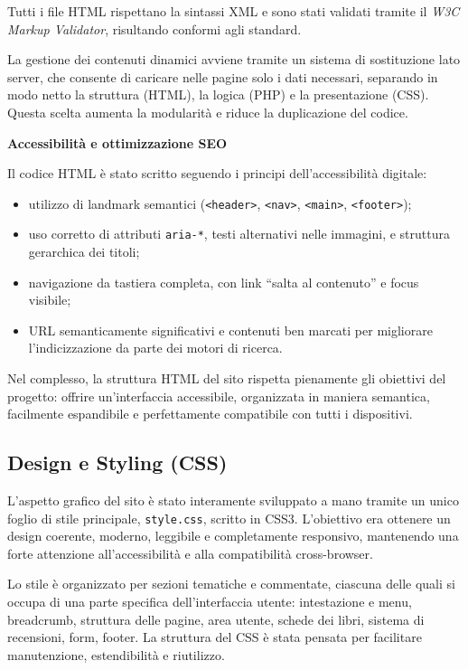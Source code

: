 \documentclass{article}
\begin{document}
Tutti i file HTML rispettano la sintassi XML e sono stati validati tramite il \textit{W3C Markup Validator}, risultando conformi agli standard.

\medskip

La gestione dei contenuti dinamici avviene tramite un sistema di sostituzione lato server, che consente di caricare nelle pagine solo i dati necessari, separando in modo netto la struttura (HTML), la logica (PHP) e la presentazione (CSS). Questa scelta aumenta la modularità e riduce la duplicazione del codice.

\bigskip

\noindent
\textbf{Accessibilità e ottimizzazione SEO}

Il codice HTML è stato scritto seguendo i principi dell’accessibilità digitale:

\begin{itemize}
  \item utilizzo di landmark semantici (\texttt{<header>}, \texttt{<nav>}, \texttt{<main>}, \texttt{<footer>});
  \item uso corretto di attributi \texttt{aria-*}, testi alternativi nelle immagini, e struttura gerarchica dei titoli;
  \item navigazione da tastiera completa, con link “salta al contenuto” e focus visibile;
  \item URL semanticamente significativi e contenuti ben marcati per migliorare l’indicizzazione da parte dei motori di ricerca.
\end{itemize}

\noindent
Nel complesso, la struttura HTML del sito rispetta pienamente gli obiettivi del progetto: offrire un’interfaccia accessibile, organizzata in maniera semantica, facilmente espandibile e perfettamente compatibile con tutti i dispositivi.


\subsection{Design e Styling (CSS)}

L’aspetto grafico del sito è stato interamente sviluppato a mano tramite un unico foglio di stile principale, \texttt{style.css}, scritto in CSS3. L’obiettivo era ottenere un design coerente, moderno, leggibile e completamente responsivo, mantenendo una forte attenzione all’accessibilità e alla compatibilità cross-browser.

Lo stile è organizzato per sezioni tematiche e commentate, ciascuna delle quali si occupa di una parte specifica dell’interfaccia utente: intestazione e menu, breadcrumb, struttura delle pagine, area utente, schede dei libri, sistema di recensioni, form, footer. La struttura del CSS è stata pensata per facilitare manutenzione, estendibilità e riutilizzo.
\end{document}
